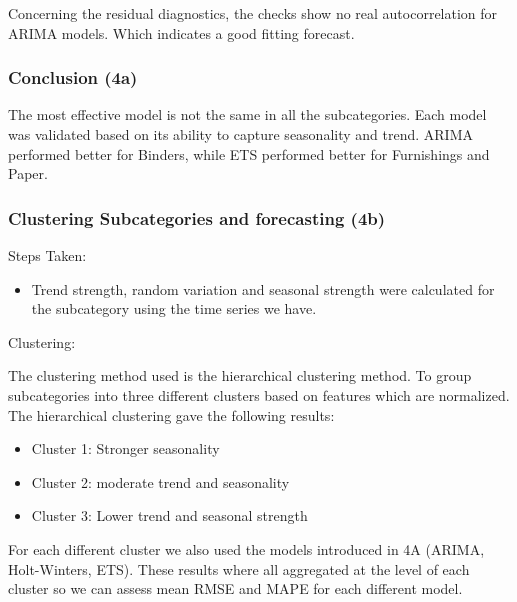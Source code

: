 \documentclass[
  letterpaper,
  DIV=11,
  numbers=noendperiod,
  oneside]{scrartcl}
\providecommand{\tightlist}{%
  \setlength{\itemsep}{0pt}\setlength{\parskip}{0pt}}\usepackage{longtable,booktabs,array}
\begin{document}
Concerning the residual diagnostics, the checks show no real
autocorrelation for ARIMA models. Which indicates a good fitting
forecast.

\subsubsection{Conclusion (4a)}\label{conclusion-4a}

The most effective model is not the same in all the subcategories. Each
model was validated based on its ability to capture seasonality and
trend. ARIMA performed better for Binders, while ETS performed better
for Furnishings and Paper.

\subsubsection{Clustering Subcategories and forecasting
(4b)}\label{clustering-subcategories-and-forecasting-4b}

Steps Taken:

\begin{itemize}
\tightlist
\item
  Trend strength, random variation and seasonal strength were calculated
  for the subcategory using the time series we have.
\end{itemize}

Clustering:

The clustering method used is the hierarchical clustering method. To
group subcategories into three different clusters based on features
which are normalized. The hierarchical clustering gave the following
results:

\begin{itemize}
\item
  Cluster 1: Stronger seasonality
\item
  Cluster 2: moderate trend and seasonality
\item
  Cluster 3: Lower trend and seasonal strength
\end{itemize}

For each different cluster we also used the models introduced in 4A
(ARIMA, Holt-Winters, ETS). These results where all aggregated at the
level of each cluster so we can assess mean RMSE and MAPE for each
different model.
\end{document}
